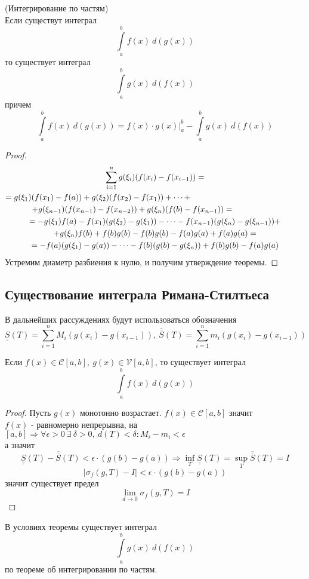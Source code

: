 \begin{numtheorem}
    (Интегрирование по частям)\\
    Если существут интеграл
    \[\int\limits_{a}^{b}f(x)\ d(g(x))\]
    то существует интеграл
    \[\int\limits_{a}^{b}g(x)\ d(f(x))\]
    причем
    \[\int\limits_{a}^{b}f(x)\ d(g(x))=f(x)\cdot g(x)|_a^b - \int\limits_{a}^{b}g(x)\ d(f(x))\]
\end{numtheorem} 
\begin{proof}
    \begin{multline*}
        \sum\limits_{i=1}^{n}g(\xi_i)(f(x_i)-f(x_{i-1}))=\\
        =g(\xi_1)(f(x_1)-f(a))+g(\xi_2)(f(x_2)-f(x_1))+\dots+\tab[5cm]\\
        +g(\xi_{n-1})(f(x_{n-1})-f(x_{n-2}))+g(\xi_{n})(f(b)-f(x_{n-1}))=\tab[2cm]\\
        =-g(\xi_1)f(a)-f(x_1)(g(\xi_2)-g(\xi_1))-\dots-f(x_{n-1})(g(\xi_n)-g(\xi_{n-1}))+\\
        +g(\xi_n)f(b)+f(b)g(b)-f(b)g(b)-f(a)g(a)+f(a)g(a)=\\ %
        =-f(a)(g(\xi_1)-g(a))-\dots-f(b)(g(b)-g(\xi_n))+f(b)g(b)-f(a)g(a)
    \end{multline*}
    Устремим диаметр разбиения к нулю, и получим утверждение теоремы.
\end{proof} 
\subsection{Существование интеграла Римана-Стилтьеса}
В дальнейших рассуждениях будут использоваться обозначения
\[\underline{\underline{S}}(T)=\sum\limits_{i=1}^{n}M_i(g(x_i)-g(x_{i-1})),\ \overline{\overline{S}}(T)=\sum\limits_{i=1}^{n}m_i(g(x_i)-g(x_{i-1}))\] 
\begin{theorem}
    Если $f(x)\in \mathcal{C}[a,b],\ g(x)\in \mathcal{V}[a,b]$, то существует интеграл
    \[\int\limits_{a}^{b}f(x)\ d(g(x))\]
\end{theorem}
\begin{proof}
    Пусть $g(x)$ монотонно возрастает. $f(x)\in \mathcal{C}[a,b]$ значит\\
    $f(x)$ - равномерно непрерывна, на $[a,b] \Rightarrow \forall \epsilon>0\ \exists\ \delta>0,\ d(T)<\delta: M_i-m_i<\epsilon$\\ 
    а значит
    \[\underline{\underline{S}}(T)-\overline{\overline{S}}(T)<\epsilon\cdot (g(b)-g(a)) \Rightarrow \inf\limits_T \underline{\underline{S}}(T)=\sup\limits_T \overline{\overline{S}}(T)=I\]
    \[|\sigma_f(g,T)-I|<\epsilon\cdot (g(b)-g(a))\]
    значит существует предел
    \[\lim\limits_{d\to 0}\sigma_f(g,T)=I\]
\end{proof} 
\begin{comm}
    В условиях теоремы существует интеграл
    \[\int\limits_{a}^{b} g(x)\ d(f(x))\]
    по теореме об интегрировании по частям.
\end{comm} 
